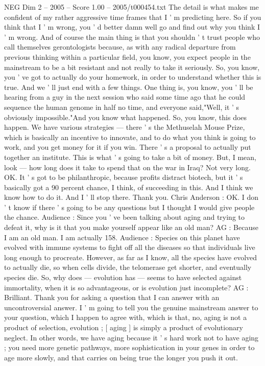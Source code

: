 \begin{textsample}{NEG Dim 2 – 2005 – Score 1.00 – 2005/t000454.txt}
The detail is what makes me confident of my rather aggressive time frames that I ' m predicting here.
So if you think that I ' m wrong, you ' d better damn well go and find out why you think I ' m wrong.
And of course the main thing is that you shouldn ' t trust people who call themselves gerontologists because, as with any radical departure from previous thinking within a particular field, you know, you expect people in the mainstream to be a bit resistant and not really to take it seriously.
So, you know, you ' ve got to actually do your homework, in order to understand whether this is true.
And we ' ll just end with a few things.
One thing is, you know, you ' ll be hearing from a guy in the next session who said some time ago that he could sequence the human genome in half no time, and everyone said,"Well, it ' s obviously impossible."And you know what happened.
So, you know, this does happen.
We have various strategies — there ' s the Methuselah Mouse Prize, which is basically an incentive to innovate, and to do what you think is going to work, and you get money for it if you win.
There ' s a proposal to actually put together an institute.
This is what ' s going to take a bit of money.
But, I mean, look — how long does it take to spend that on the war in Iraq?
Not very long.
OK.
It ' s got to be philanthropic, because profits distract biotech, but it ' s basically got a 90 percent chance, I think, of succeeding in this.
And I think we know how to do it.
And I ' ll stop there.
Thank you.
Chris Anderson : OK.
I don ' t know if there ' s going to be any questions but I thought I would give people the chance.
Audience : Since you ' ve been talking about aging and trying to defeat it, why is it that you make yourself appear like an old man?
AG : Because I am an old man.
I am actually 158.
Audience : Species on this planet have evolved with immune systems to fight off all the diseases so that individuals live long enough to procreate.
However, as far as I know, all the species have evolved to actually die, so when cells divide, the telomerase get shorter, and eventually species die.
So, why does — evolution has — seems to have selected against immortality, when it is so advantageous, or is evolution just incomplete?
AG : Brilliant.
Thank you for asking a question that I can answer with an uncontroversial answer.
I ' m going to tell you the genuine mainstream answer to your question, which I happen to agree with, which is that, no, aging is not a product of selection, evolution ; [ aging ] is simply a product of evolutionary neglect.
In other words, we have aging because it ' s hard work not to have aging ; you need more genetic pathways, more sophistication in your genes in order to age more slowly, and that carries on being true the longer you push it out.

\end{textsample}
